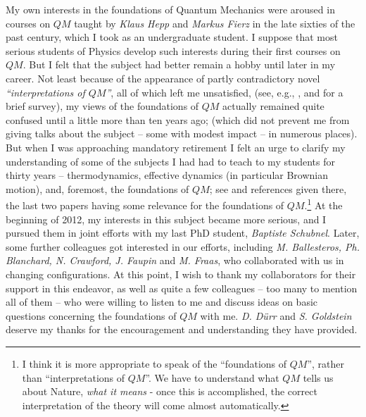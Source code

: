 \documentclass[12pt]{article}
\begin{document}
My own interests in the foundations of Quantum Mechanics were aroused in courses on $QM$ taught by \textit{Klaus Hepp} and \textit{Markus Fierz} in the late sixties of the past century, which I took as an undergraduate student. I suppose that most serious students of Physics develop such interests during their first courses on $QM$. But I felt that the subject had better remain a hobby until later in my career. Not least because of the appearance of partly contradictory novel \textit{``interpretations of $QM$''}, all of which left me unsatisfied, (see, e.g., \cite{Griffiths, Durr-Teufel}, and \cite{FS-Vienna} for a brief survey), my views of the foundations of $QM$ actually remained quite confused until a little more than ten years ago; (which did not prevent me from giving talks about the subject -- some with modest impact -- in numerous places). But when I was approaching mandatory retirement I felt an urge to clarify my understanding of some of the subjects I had had to teach to my students for thirty years -- thermodynamics, effective dynamics (in particular Brownian motion), and, foremost, the foundations of $QM$; see \cite{Abou-Salem-F, DeR-Fr, Gang-F, B-DeR-F} and references given there, the last two papers having some relevance for the foundations of $QM$.\footnote{I think it is more appropriate to speak of the ``foundations of $QM$'', rather than ``interpretations of $QM$''. We have to understand what $Q M$ tells us about Nature, \textit{what it means} - once this is accomplished, the correct interpretation of the theory will come almost automatically.} At the beginning of 2012, my interests in this subject became more serious, and I pursued them in joint efforts with my last PhD student, \textit{Baptiste Schubnel}. Later, some further colleagues got interested in our efforts, including \textit{M. Ballesteros, Ph. Blanchard, N. Crawford, J. Faupin} and \textit{M. Fraas}, who collaborated with us in changing configurations. At this point, I wish to thank my collaborators for their support in this endeavor, as well as quite a few colleagues -- too many to mention all of them -- who were willing to listen to me and discuss ideas on basic questions concerning the foundations of $QM$ with me. \textit{D. D\"{u}rr} and \textit{S. Goldstein} deserve my thanks for the encouragement and understanding they have provided.
\end{document}

